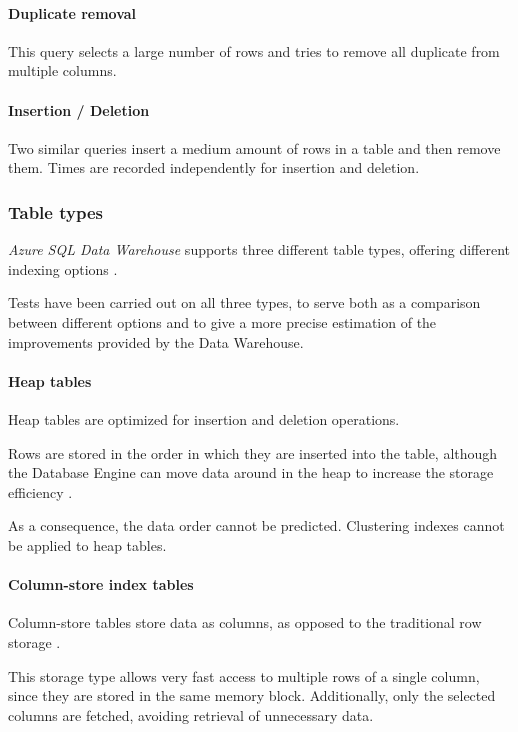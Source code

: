     \paragraph{Duplicate removal}
        This query selects a large number of rows and tries to remove all duplicate from multiple columns.
        
    \paragraph{Insertion / Deletion}
        Two similar queries insert a medium amount of rows in a table and then remove them.
        Times are recorded independently for insertion and deletion.
        
\subsubsection{Table types}
    \textit{Azure SQL Data Warehouse} supports three different table types, offering different indexing options \cite{bib:tests:perf:indexing}.
    
    Tests have been carried out on all three types, to serve both as a comparison between different options and to give a more precise estimation of the improvements provided by the Data Warehouse.
    
    \paragraph{Heap tables}
        Heap tables are optimized for insertion and deletion operations.
        
        Rows are stored in the order in which they are inserted into the table, although the Database Engine can move data around in the heap to increase the storage efficiency \cite{bib:tests:perf:heap}.
        
        As a consequence, the data order cannot be predicted. Clustering indexes cannot be applied to heap tables.
        
    \paragraph{Column-store index tables}
        Column-store tables store data as columns, as opposed to the traditional row storage \cite{bib:tests:perf:columnstore}.
        
        This storage type allows very fast access to multiple rows of a single column, since they are stored in the same memory block.
        Additionally, only the selected columns are fetched, avoiding retrieval of unnecessary data.
        
